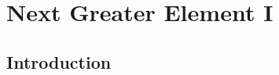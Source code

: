 %



\chapter{Next Greater Element \RN{1}}
\label{ch:next_greater_element}
\section*{Introduction}

